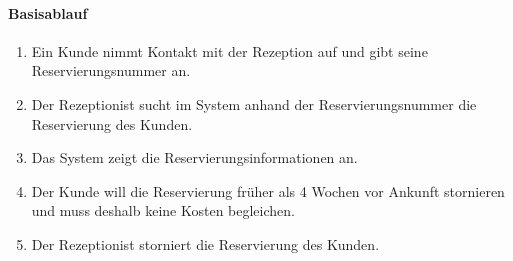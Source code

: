 \paragraph{Basisablauf}
\begin{enumerate}
\item Ein \Gls{Kunde} nimmt Kontakt mit der \Gls{Rezeption} auf und gibt seine \Gls{Reservierungsnummer} an.
\item Der \Gls{Rezeptionist} sucht im System anhand der \Gls{Reservierungsnummer} die \Gls{Reservierung} des \Gls{Kunde}n.
\item Das System zeigt die Reservierungsinformationen an.
\item Der \Gls{Kunde} will die \Gls{Reservierung} früher als 4 Wochen vor Ankunft stornieren und muss deshalb keine Kosten begleichen.
\item Der \Gls{Rezeptionist} storniert die Reservierung des \Gls{Kunde}n.
\end{enumerate}

